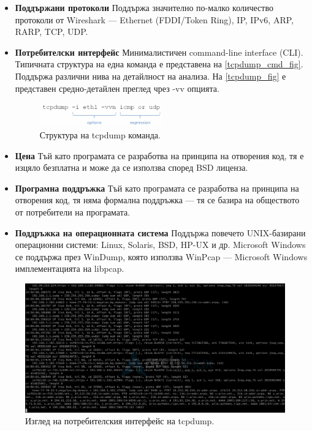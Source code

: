 \documentclass[12pt,a4paper,oneside]{book}
\begin{document}
\begin{itemize}
  \item \textbf{Поддържани протоколи} Поддържа значително по-малко количество
    протоколи от Wireshark --- Ethernet (FDDI/Token Ring), IP, IPv6, ARP, RARP,
    TCP, UDP.
  \item \textbf{Потребителски интерфейс} Минималистичен command-line interface
    (CLI). Типичната структура на една команда е представена на
    \autoref{tcpdump_cmd_fig}. Поддържа различни нива на детайлност на анализа.
    На \autoref{tcpdump_fig} е представен средно-детайлен преглед чрез -vv
    опцията.

  \begin{figure}[h!]
    \centering
    \includegraphics[width=0.5\textwidth]{figures/tcpdump_cmd.png}
    \caption{Структура на tcpdump команда.}
    \label{tcpdump_cmd_fig}
  \end{figure}

  \item \textbf{Цена} Тъй като програмата се разработва на принципа на отворения
    код, тя е изцяло безплатна и може да се използва според BSD лиценза.
  \item \textbf{Програмна поддръжка} Тъй като програмата се разработва на
    принципа на отворения код, тя няма формална поддръжка --- тя се
    базира на обществото от потребители на програмата.
  \item \textbf{Поддръжка на операционната система} Поддържа повечето
    UNIX-базирани операционни системи: Linux, Solaris, BSD, HP-UX и др.
    Microsoft Windows се поддържа през WinDump, която използва
    WinPcap --- Microsoft Windows имплементацията на libpcap.
\end{itemize}


\begin{figure}[h!]
  \centering
  \includegraphics[width=1.0\textwidth]{figures/tcpdump.png}
  \caption{Изглед на потребителския интерфейс на tcpdump.}
  \label{tcpdump_fig}
\end{figure}
\end{document}
